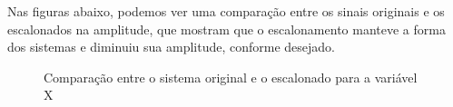 \documentclass[12pt]{article}
\begin{document}
    Nas figuras abaixo, podemos ver uma comparação entre os sinais originais e os escalonados na amplitude, que mostram que o escalonamento manteve a forma dos sistemas e diminuiu sua amplitude, conforme desejado.
    \begin{figure}[H]
        \caption{Comparação entre o sistema original e o escalonado para a variável X}
    \end{figure}
\end{document}
